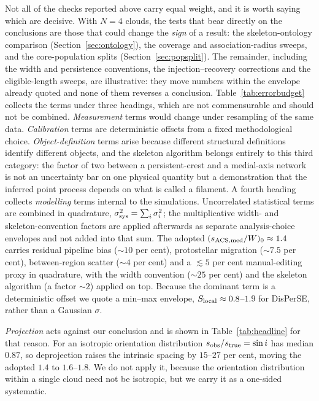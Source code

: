 \documentclass[usenatbib,twoside,twocolumn]{mnras}
\begin{document}
Not all of the checks reported above carry equal weight, and it is worth saying which are decisive. With $N=4$ clouds, the tests that bear directly on the conclusions are those that could change the \emph{sign} of a result: the skeleton-ontology comparison (Section~\ref{sec:ontology}), the coverage and association-radius sweeps, and the core-population splits (Section~\ref{sec:popsplit}). The remainder, including the width and persistence conventions, the injection--recovery corrections and the eligible-length sweeps, are illustrative: they move numbers within the envelope already quoted and none of them reverses a conclusion. Table~\ref{tab:errorbudget} collects the terms under three headings, which are not commensurable and should not be combined. \emph{Measurement} terms would change under resampling of the same data. \emph{Calibration} terms are deterministic offsets from a fixed methodological choice. \emph{Object-definition} terms arise because different structural definitions identify different objects, and the skeleton algorithm belongs entirely to this third category: the factor of two between a persistent-crest and a medial-axis network is not an uncertainty bar on one physical quantity but a demonstration that the inferred point process depends on what is called a filament. A fourth heading collects \emph{modelling} terms internal to the simulations. Uncorrelated statistical terms are combined in quadrature, $\sigma_{\rm sys}^2=\sum_i\sigma_i^2$; the multiplicative width- and skeleton-convention factors are applied afterwards as separate analysis-choice envelopes and not added into that sum. The adopted $(s_{\rm ACS,med}/W)_0\approx1.4$ carries residual pipeline bias ($\sim10$ per cent), protostellar migration ($\sim7.5$ per cent), between-region scatter ($\sim4$ per cent) and a $\lesssim5$ per cent manual-editing proxy in quadrature, with the width convention ($\sim25$ per cent) and the skeleton algorithm (a factor $\sim2$) applied on top. Because the dominant term is a deterministic offset we quote a min--max envelope, $S_{\rm local}\approx0.8$--$1.9$ for DisPerSE, rather than a Gaussian $\sigma$.

\emph{Projection} acts against our conclusion and is shown in Table~\ref{tab:headline} for that reason. For an isotropic orientation distribution $s_{\rm obs}/s_{\rm true}=\sin i$ has median $0.87$, so deprojection raises the intrinsic spacing by $15$--$27$ per cent, moving the adopted $1.4$ to $1.6$--$1.8$. We do not apply it, because the orientation distribution within a single cloud need not be isotropic, but we carry it as a one-sided systematic.
\end{document}
